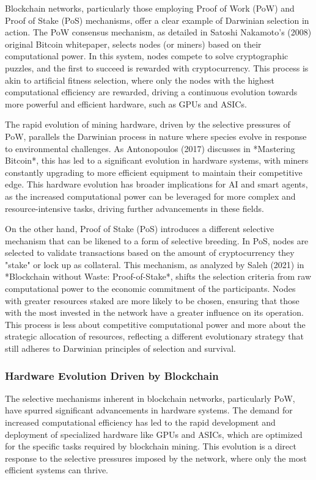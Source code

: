 \documentclass[12pt,twoside]{article}
\begin{document}
Blockchain networks, particularly those employing Proof of Work (PoW) and Proof of Stake (PoS) mechanisms, offer a clear example of Darwinian selection in action. The PoW consensus mechanism, as detailed in Satoshi Nakamoto’s (2008) original Bitcoin whitepaper, selects nodes (or miners) based on their computational power. In this system, nodes compete to solve cryptographic puzzles, and the first to succeed is rewarded with cryptocurrency. This process is akin to artificial fitness selection, where only the nodes with the highest computational efficiency are rewarded, driving a continuous evolution towards more powerful and efficient hardware, such as GPUs and ASICs.

The rapid evolution of mining hardware, driven by the selective pressures of PoW, parallels the Darwinian process in nature where species evolve in response to environmental challenges. As Antonopoulos (2017) discusses in *Mastering Bitcoin*, this has led to a significant evolution in hardware systems, with miners constantly upgrading to more efficient equipment to maintain their competitive edge. This hardware evolution has broader implications for AI and smart agents, as the increased computational power can be leveraged for more complex and resource-intensive tasks, driving further advancements in these fields.

On the other hand, Proof of Stake (PoS) introduces a different selective mechanism that can be likened to a form of selective breeding. In PoS, nodes are selected to validate transactions based on the amount of cryptocurrency they "stake" or lock up as collateral. This mechanism, as analyzed by Saleh (2021) in *Blockchain without Waste: Proof-of-Stake*, shifts the selection criteria from raw computational power to the economic commitment of the participants. Nodes with greater resources staked are more likely to be chosen, ensuring that those with the most invested in the network have a greater influence on its operation. This process is less about competitive computational power and more about the strategic allocation of resources, reflecting a different evolutionary strategy that still adheres to Darwinian principles of selection and survival.

\subsubsection{Hardware Evolution Driven by Blockchain}

The selective mechanisms inherent in blockchain networks, particularly PoW, have spurred significant advancements in hardware systems. The demand for increased computational efficiency has led to the rapid development and deployment of specialized hardware like GPUs and ASICs, which are optimized for the specific tasks required by blockchain mining. This evolution is a direct response to the selective pressures imposed by the network, where only the most efficient systems can thrive.
\end{document}
